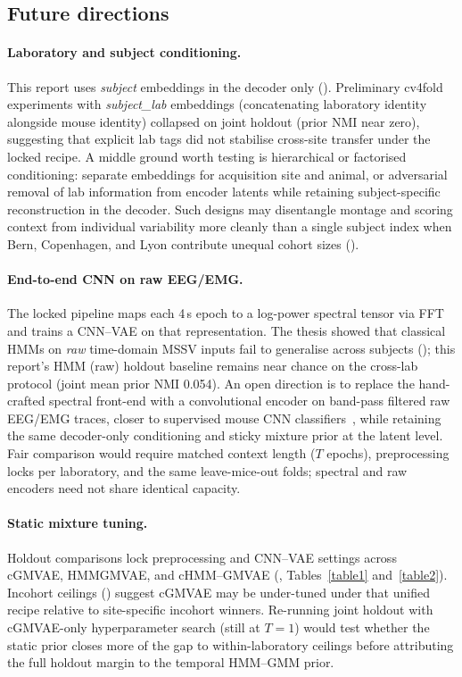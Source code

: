 \subsection{Future directions}
\label{S13_Appendix_future}

\paragraph*{Laboratory and subject conditioning.}
This report uses \emph{subject} embeddings in the decoder only ().
Preliminary cv4fold experiments with \emph{subject\_lab} embeddings (concatenating laboratory identity alongside mouse identity) collapsed on joint holdout (prior NMI near zero), suggesting that explicit lab tags did not stabilise cross-site transfer under the locked recipe.
A middle ground worth testing is hierarchical or factorised conditioning: separate embeddings for acquisition site and animal, or adversarial removal of lab information from encoder latents while retaining subject-specific reconstruction in the decoder.
Such designs may disentangle montage and scoring context from individual variability more cleanly than a single subject index when Bern, Copenhagen, and Lyon contribute unequal cohort sizes ().

\paragraph*{End-to-end CNN on raw EEG/EMG.}
The locked pipeline maps each 4\,s epoch to a log-power spectral tensor via FFT and trains a CNN--VAE on that representation.
The thesis showed that classical HMMs on \emph{raw} time-domain MSSV inputs fail to generalise across subjects (); this report's HMM (raw) holdout baseline remains near chance on the cross-lab protocol (joint mean prior NMI 0.054).
An open direction is to replace the hand-crafted spectral front-end with a convolutional encoder on band-pass filtered raw EEG/EMG traces, closer to supervised mouse CNN classifiers~\cite{garciaciudad2024temporal,miladinovic2019spindle}, while retaining the same decoder-only conditioning and sticky mixture prior at the latent level.
Fair comparison would require matched context length ($T$ epochs), preprocessing locks per laboratory, and the same leave-mice-out folds; spectral and raw encoders need not share identical capacity.

\paragraph*{Static mixture tuning.}
Holdout comparisons lock preprocessing and CNN--VAE settings across cGMVAE, HMMGMVAE, and cHMM--GMVAE (, Tables~\ref{table1} and~\ref{table2}).
Incohort ceilings () suggest cGMVAE may be under-tuned under that unified recipe relative to site-specific incohort winners.
Re-running joint holdout with cGMVAE-only hyperparameter search (still at $T{=}1$) would test whether the static prior closes more of the gap to within-laboratory ceilings before attributing the full holdout margin to the temporal HMM--GMM prior.

